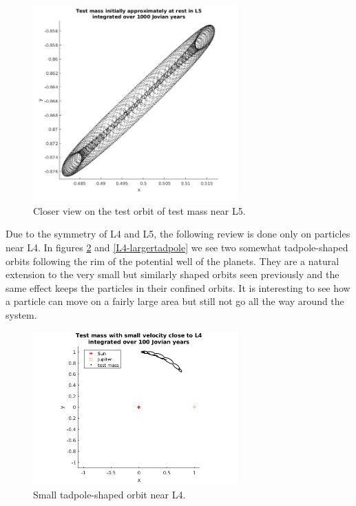 \documentclass[12pt,a4paper,titlepage]{article}
\begin{document}
\begin{figure}
\centering
\includegraphics[width=0.7\textwidth]{../plots/L5-stationary-zoom.png}
\caption{Closer view on the test orbit of test mass near L5.}
\label{L5-zoom}
\end{figure}

Due to the symmetry of L4 and L5, the following review is done only on particles near L4. In figures \ref{L4-tadpole} and \ref{L4-largertadpole} we see two somewhat tadpole-shaped orbits following the rim of the potential well of the planets. They are a natural extension to the very small but similarly shaped orbits seen previously and the same effect keeps the particles in their confined orbits. It is interesting to see how a particle can move on a fairly large area but still not go all the way around the system.

\begin{figure}
\centering
\includegraphics[width=0.7\textwidth]{../plots/L4-closerToOrigin.png}
\caption{Small tadpole-shaped orbit near L4.}
\label{L4-tadpole}
\end{figure}
\end{document}
